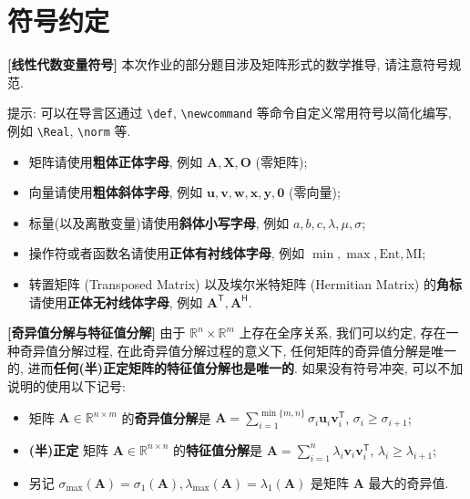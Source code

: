 \documentclass[a4paper]{article}
\numberwithin{equation}{section}
\theoremstyle{definition}
\def \transposed {\mathsf{T}}
\def \hermitian {\mathsf{H}}
\def \Real {\mathbb{R}}
\def \A {\mathbf{A}}
\def \O {\mathbf{O}}
\def \X {\mathbf{X}}
\def \u {\bm{u}}
\def \v {\bm{v}}
\def \w {\bm{w}}
\def \y {\bm{y}}
\def \x {\bm{x}}
\begin{document}
\newpage

\section*{符号约定}

\textbf{[线性代数变量符号]} 本次作业的部分题目涉及矩阵形式的数学推导, 请注意符号规范.

提示: 可以在导言区通过 \texttt{\textbackslash{def}}, \texttt{\textbackslash{newcommand}} 等命令自定义常用符号以简化编写, 例如 \texttt{\textbackslash{Real}}, \texttt{\textbackslash{norm}} 等.

\begin{itemize}
	\setlength\itemsep{0em}
	\item 矩阵请使用\textbf{粗体正体字母}, 例如 $\A, \X, \O$ (零矩阵);
	\item 向量请使用\textbf{粗体斜体字母}, 例如 $\u, \v, \w, \x, \y, \bm{0}$ (零向量);
	\item 标量(以及离散变量)请使用\textbf{斜体小写字母}, 例如 $a, b, c, \lambda, \mu, \sigma$;
	\item 操作符或者函数名请使用\textbf{正体有衬线体字母}, 例如 $\min, \max, \mathrm{Ent}, \mathrm{MI}$;
	\item 转置矩阵 (Transposed Matrix) 以及埃尔米特矩阵 (Hermitian Matrix) 的\textbf{角标}请使用\textbf{正体无衬线体字母}, 例如 $\A^\transposed, \A^\hermitian$.
\end{itemize}

\textbf{[奇异值分解与特征值分解]} 由于 $\Real^n \times \Real^m$ 上存在全序关系, 我们可以约定, 存在一种奇异值分解过程, 在此奇异值分解过程的意义下, 任何矩阵的奇异值分解是唯一的, 进而\textbf{任何(半)正定矩阵的特征值分解也是唯一的}. 如果没有符号冲突, 可以不加说明的使用以下记号:

\begin{itemize}
	\setlength\itemsep{0em}
	\item 矩阵 $\A \in \Real^{n \times m}$ 的\textbf{奇异值分解}是 $\A = \sum_{i=1}^{\min\{m,n\}} \sigma_i \u_i \v_i^\transposed$, $\sigma_i \geqslant \sigma_{i+1}$;
	\item \textbf{(半)正定} 矩阵 $\A \in \Real^{n \times n}$ 的\textbf{特征值分解}是 $\A = \sum_{i=1}^{n} \lambda_i \v_i \v_i^\transposed$, $\lambda_i \geqslant \lambda_{i+1}$;
	\item 另记 $\sigma_{\max}(\A) = \sigma_1(\A), \lambda_{\max}(\A) = \lambda_1(\A)$ 是矩阵 $\A$ 最大的奇异值.
\end{itemize}
\end{document}
